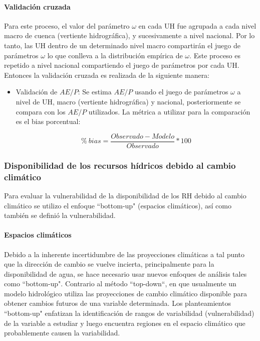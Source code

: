 \documentclass[12pt]{article}
\begin{document}
\clearpage %
\paragraph{Validación cruzada}\mbox{}

Para este proceso, el valor del parámetro $\omega$ en cada UH fue agrupada a cada nivel macro de cuenca (vertiente hidrográfica), y sucesivamente a nivel nacional. Por lo tanto, las UH dentro de un determinado nivel macro compartirán el juego de parámetros $\omega$ lo que conlleva a la distribución empírica de $\omega$. Este proceso es repetido a nivel nacional compartiendo el juego de parámetros por cada UH. Entonces la validación cruzada es realizada de la siguiente manera:

\begin{itemize}
  \item Validación de $AE/P$: Se estima $AE/P$ usando el juego de parámetros $\omega$ a nivel de UH, macro (vertiente hidrográfica) y nacional, posteriormente se compara con los $AE/P$ utilizados. La métrica a utilizar para la comparación es el bias porcentual:
  
    \begin{equation}
    \%\ bias = \frac{Observado-Modelo}{Observado}*100
    \end{equation}
\end{itemize}


\subsubsection{Disponibilidad de los recursos hídricos debido al cambio climático}

Para evaluar la vulnerabilidad de la disponibilidad de los RH debido al cambio climático se utilizo el enfoque “bottom-up" (espacios climáticos), así como también se definió la vulnerabilidad.


\paragraph{Espacios climáticos}\mbox{}

Debido a la inherente incertidumbre de las proyecciones climáticas a tal punto que la dirección de cambio se vuelve incierta, principalmente para la disponibilidad de agua, se hace necesario usar nuevos enfoques de análisis tales como “bottom-up". Contrario al método “top-down“, en que usualmente un modelo hidrológico utiliza las proyecciones de cambio climático disponible para obtener cambios futuros de una variable determinada. Los planteamientos “bottom-up" enfatizan la identificación de rangos de variabilidad (vulnerabilidad) de la variable a estudiar y luego encuentra regiones en el espacio climático que probablemente causen la variabilidad.
\end{document}
